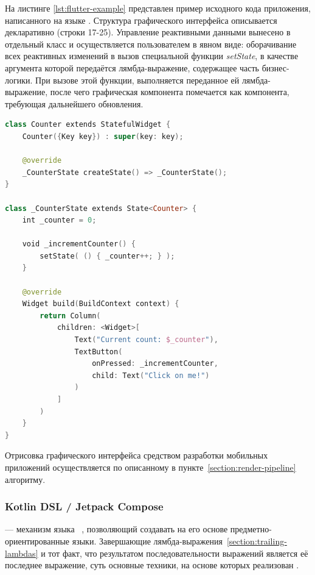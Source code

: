 На листинге \ref{lst:flutter-example} представлен пример исходного кода
приложения, написанного на языке .
Структура графического интерфейса описывается декларативно (строки 17-25).
Управление реактивными данными вынесено в отдельный
класс и осуществляется пользователем в явном виде: оборачивание всех
реактивных изменений в вызов специальной функции \textit{setState}, в
качестве аргумента которой передаётся лямбда-выражение, содержащее часть
бизнес-логики. При вызове этой функции, выполняется переданное ей
лямбда-выражение, после чего графическая компонента помечается как
компонента, требующая дальнейшего обновления.
\begin{lstlisting}[language=Swift,caption=\name{Flutter}. Счётчик нажатия кнопки,label={lst:flutter-example}]
class Counter extends StatefulWidget {
    Counter({Key key}) : super(key: key);
    
    @override
    _CounterState createState() => _CounterState();
}

class _CounterState extends State<Counter> {
    int _counter = 0;

    void _incrementCounter() {
        setState( () { _counter++; } );
    }
    
    @override
    Widget build(BuildContext context) {
        return Column(
            children: <Widget>[
                Text("Current count: $_counter"),
                TextButton(
                    onPressed: _incrementCounter,
                    child: Text("Click on me!")
                )
            ]
        )
    }
}
\end{lstlisting}

Отрисовка графического интерфейса средством разработки мобильных
приложений  осуществляется по описанному в
пункте~\ref{section:render-pipeline} алгоритму.

\subsubsection*{Kotlin DSL / Jetpack Compose}
 --- механизм языка ~\cite{kotlin-homepage},
позволяющий создавать на его основе предметно-ориентированные языки.
Завершающие лямбда-выражения~\ref{section:trailing-lambdas} и тот факт, что
результатом последовательности выражений является её последнее выражение,
суть основные техники, на основе которых реализован .

